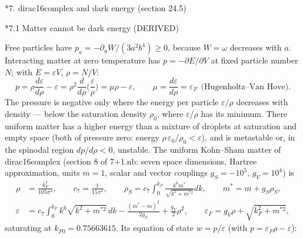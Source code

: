 \documentclass[10pt,a4paper]{article}
\makeatletter
\renewcommand\section{\@startsection{section}{1}{\z@}{-3.5ex \@plus -1ex \@minus -.2ex}{2.3ex \@plus.2ex}{\normalfont\Large\bfseries\raggedright}}
\renewcommand\subsection{\@startsection{subsection}{2}{\z@}{-3.25ex\@plus -1ex \@minus -.2ex}{1.5ex \@plus .2ex}{\normalfont\large\bfseries\raggedright}}
\makeatother
\begin{document}
\section*{7. dirac16complex and dark energy (section 24.5)}
\subsection*{7.1 Matter cannot be dark energy (DERIVED)}
Free particles have $p_a=-\partial_aW/(3a^2b^4)\ge0$, because $W=\omega$ decreases with $a$. Interacting matter at zero temperature has $p=-\partial E/\partial V$ at fixed particle number $N$; with $E=\varepsilon V$, $\rho=N/V$:
\begin{equation*}
p=\rho\frac{d\varepsilon}{d\rho}-\varepsilon=\rho^2\frac{d}{d\rho}\Big(\frac\varepsilon\rho\Big)=\mu\rho-\varepsilon,\qquad \mu=\frac{d\varepsilon}{d\rho}=\varepsilon_F\ \ \text{(Hugenholtz–Van Hove)}.
\end{equation*}
The pressure is negative only where the energy per particle $\varepsilon/\rho$ decreases with density — below the saturation density $\rho_0$, where $\varepsilon/\rho$ has its minimum. There uniform matter has a higher energy than a mixture of droplets at saturation and empty space (both of pressure zero: energy $\rho\,\varepsilon_0/\rho_0<\varepsilon$), and is metastable or, in the spinodal region $dp/d\rho<0$, unstable. The uniform Kohn–Sham matter of dirac16complex (section 8 of 7+1.nb: seven space dimensions, Hartree approximation, units $m=1$, scalar and vector couplings $g_S=-10^5$, $g_V=10^4$) is
\begin{align*}
\rho&=\frac{k_F^7}{105\pi^4},\qquad c_7=\frac1{15\pi^4},\qquad \rho_S=c_7\int_0^{k_F}\frac{k^6m^*}{\sqrt{k^2+m^{*2}}}dk,\qquad m^*=m+g_S\rho_S, \\
\varepsilon&=c_7\int_0^{k_F}k^6\sqrt{k^2+m^{*2}}\,dk-\frac{(m^*-m)^2}{2g_S}+\frac{g_V}2\rho^2,\qquad \varepsilon_F=g_V\rho+\sqrt{k_F^2+m^{*2}},
\end{align*}
saturating at $k_{F0}=0.75663615$. Its equation of state $w=p/\varepsilon$ (with $p=\varepsilon_F\rho-\varepsilon$):
\end{document}
